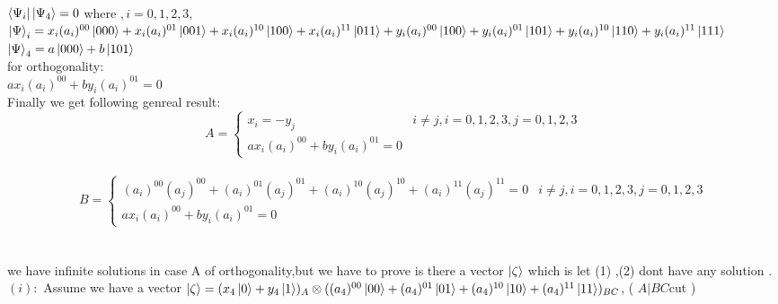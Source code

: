 \documentclass[a4paper,12pt]{article}
\begin{document}
\leavevmode
\newline \\

$\bra{\Psi_{i}}\ket{\Psi_{4}}=0 $       where     $ ,i=0,1,2,3,   $ 
\leavevmode
\newline  \\
$\ket{\Psi}_{i}=x_{i}(a_{i})^{00}\ket{000}+x_{i}(a_{i})^{01}\ket{001}+x_{i}(a_{i})^{10}\ket{100}+x_{i}(a_{i})^{11}\ket{011}+y_{i}(a_{i})^{00}\ket{100}+y_{i}(a_{i})^{01}\ket{101}+y_{i}(a_{i})^{10}\ket{110}+y_{i}(a_{i})^{11}\ket{111}$
\leavevmode
\newline \\
$\ket{\Psi}_{4}=a\ket{000}+b\ket{101}$
\newline \\
for orthogonality:
\newline \\
$a x_{i}(a_{i})^{00}+b y_{i}(a_{i})^{01}=0$
\newline \\


Finally we get following genreal result:
 \begin{equation}
 A = \begin{cases}
x_{i}=-y_{j}        &  i\neq j   ,i=0,1,2,3,   j=0,1,2,3\\
 a x_{i}(a_{i})^{00}+b y_{i}(a_{i})^{01}=0
 \end{cases}
 \end{equation}
 \newline \\
 \begin{equation}
 B = \begin{cases}
(a_{i})^{00}(a_{j})^{00}+(a_{i})^{01}(a_{j})^{01}+(a_{i})^{10}(a_{j})^{10}+(a_{i})^{11}(a_{j})^{11}=0        &  i\neq j   ,i=0,1,2,3,   j=0,1,2,3\\
 a x_{i}(a_{i})^{00}+b y_{i}(a_{i})^{01}=0
 \end{cases}
 \end{equation}
 \newline \\
 \leavevmode
 \newline \\
 we have infinite solutions in case A of orthogonality,but we have to prove  is  there a vector  $\ket{\zeta}$ which is  let (1) ,(2) dont have  any solution .
 \newline \\
$(i)    :$ Assume we have a vector $\ket{\zeta}=(x_{4}\ket{0}+y_{4}\ket{1})_{A}\otimes ((a_{4})^{00}\ket{00}+(a_{4})^{01}\ket{01}+(a_{4})^{10}\ket{10}+(a_{4})^{11}\ket{11})_{BC}$,   ( $      A|BC    $cut   )
 
\end{document}
